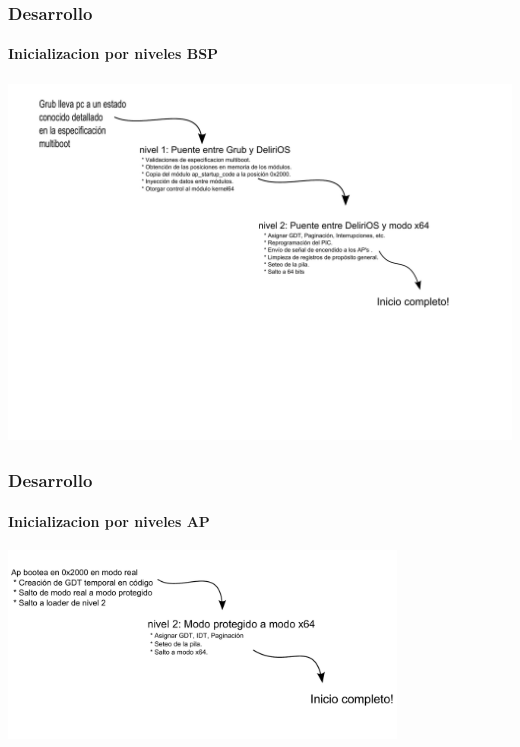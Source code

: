 \documentclass{beamer}
\begin{document}
\begin{frame}
  \frametitle{Desarrollo}
  \framesubtitle{Inicializacion por niveles BSP}
  \begin{center}
  \includegraphics[height=9.5cm]{images/bsp-stages-diagram.pdf} 
  \end{center}
\end{frame}

\begin{frame}
  \frametitle{Desarrollo}
  \framesubtitle{Inicializacion por niveles AP}
  \begin{center}
  \includegraphics[height=5cm]{images/ap-stages-diagram.pdf} 
  \end{center}
\end{frame}
\end{document}
